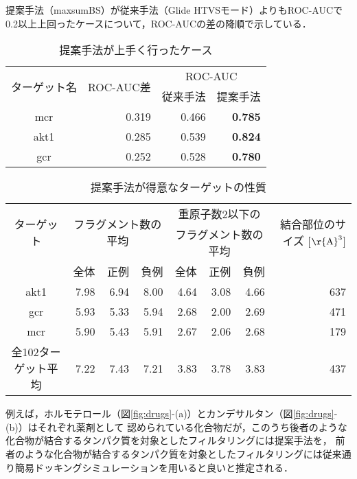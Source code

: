 \begin{table}[hb] \centering
	\caption{提案手法が上手く行ったケース}
	\label{table:target_accuracy_good}
	提案手法（maxsumBS）が従来手法（Glide HTVSモード）よりもROC-AUCで\\
	0.2以上上回ったケースについて，ROC-AUCの差の降順で示している．
	\begin{tabular}{c|r|rr}
	\hline
	\multirow{2}{*}{ターゲット名}	&\multirow{2}{*}{ROC-AUC差}	&\multicolumn{2}{c}{ROC-AUC}	\\
							&							&従来手法	&提案手法		\\ \hline
	mcr					&0.319						&0.466		&{\bf 0.785}		\\
	akt1					&0.285						&0.539		&{\bf 0.824}		\\
	gcr						&0.252						&0.528		&{\bf 0.780}		\\ \hline
	\end{tabular}
\end{table}
\begin{table}[htb] \centering
	\caption{提案手法が得意なターゲットの性質}
	\label{table:good_property}
	\begin{tabular}{c|rrrrrrr}
	\hline
	\multirow{2}{*}{ターゲット}	&\multicolumn{3}{c}{\multirow{2}{*}{フラグメント数の平均}}	&\multicolumn{3}{c}{重原子数2以下の}		&\multirow{2}{*}{結合部位のサイズ [$\mathrm{\r{A}}^3$]}	\\
							&		&		&								&\multicolumn{3}{c}{フラグメント数の平均}	&										\\
							&全体	&正例	&負例							&全体	&正例		&負例			&										\\ \hline
	akt1						&7.98	&6.94	&8.00							&4.64	&3.08		&4.66			&637									\\
	gcr						&5.93	&5.33	&5.94							&2.68	&2.00		&2.69			&471									\\
	mcr						&5.90	&5.43	&5.91							&2.67	&2.06		&2.68			&179									\\ \hline
	全102ターゲット平均		&7.22	&7.43	&7.21							&3.83	&3.78		&3.83			&437									\\ \hline
	\end{tabular}
\end{table}

\newpage

例えば，ホルモテロール（図\ref{fig:drugs}-(a)）とカンデサルタン（図\ref{fig:drugs}-(b)）はそれぞれ薬剤として
認められている化合物だが，このうち後者のような化合物が結合するタンパク質を対象としたフィルタリングには提案手法を，
前者のような化合物が結合するタンパク質を対象としたフィルタリングには従来通り簡易ドッキングシミュレーションを用いると良いと推定される．

